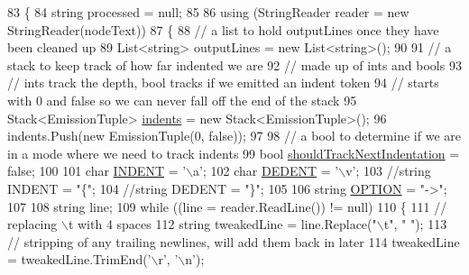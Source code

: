 \begin{DoxyCode}
83         \{
84             \textcolor{keywordtype}{string} processed = null;
85 
86             \textcolor{keyword}{using} (StringReader reader = \textcolor{keyword}{new} StringReader(nodeText))
87             \{
88                 \textcolor{comment}{// a list to hold outputLines once they have been cleaned up}
89                 List<string> outputLines = \textcolor{keyword}{new} List<string>();
90 
91                 \textcolor{comment}{// a stack to keep track of how far indented we are}
92                 \textcolor{comment}{// made up of ints and bools}
93                 \textcolor{comment}{// ints track the depth, bool tracks if we emitted an indent token}
94                 \textcolor{comment}{// starts with 0 and false so we can never fall off the end of the stack}
95                 Stack<EmissionTuple> \hyperlink{a00324_a00fba9ee9674b2513dbe28eab795b734}{indents} = \textcolor{keyword}{new} Stack<EmissionTuple>();
96                 indents.Push(\textcolor{keyword}{new} EmissionTuple(0, \textcolor{keyword}{false}));
97 
98                 \textcolor{comment}{// a bool to determine if we are in a mode where we need to track indents}
99                 \textcolor{keywordtype}{bool} \hyperlink{a00324_afa485f45ab87bc0f06c1dfc46737c057}{shouldTrackNextIndentation} = \textcolor{keyword}{false};
100 
101                 \textcolor{keywordtype}{char} \hyperlink{a00324_ae3f2190a793ab77428838e58e0e83676}{INDENT} = \textcolor{charliteral}{'\(\backslash\)a'};
102                 \textcolor{keywordtype}{char} \hyperlink{a00324_a83653c3e52fa74614e655a91ad2b7181}{DEDENT} = \textcolor{charliteral}{'\(\backslash\)v'};
103                 \textcolor{comment}{//string INDENT = "\{";}
104                 \textcolor{comment}{//string DEDENT = "\}";}
105 
106                 \textcolor{keywordtype}{string} \hyperlink{a00324_a7ca2dc5371587b21476669a45af013cd}{OPTION} = \textcolor{stringliteral}{"->"};
107 
108                 \textcolor{keywordtype}{string} line;
109                 \textcolor{keywordflow}{while} ((line = reader.ReadLine()) != null)
110                 \{
111                     \textcolor{comment}{// replacing \(\backslash\)t with 4 spaces}
112                     \textcolor{keywordtype}{string} tweakedLine = line.Replace(\textcolor{stringliteral}{"\(\backslash\)t"}, \textcolor{stringliteral}{"    "});
113                     \textcolor{comment}{// stripping of any trailing newlines, will add them back in later}
114                     tweakedLine = tweakedLine.TrimEnd(\textcolor{charliteral}{'\(\backslash\)r'}, \textcolor{charliteral}{'\(\backslash\)n'});

\end{DoxyCode}
